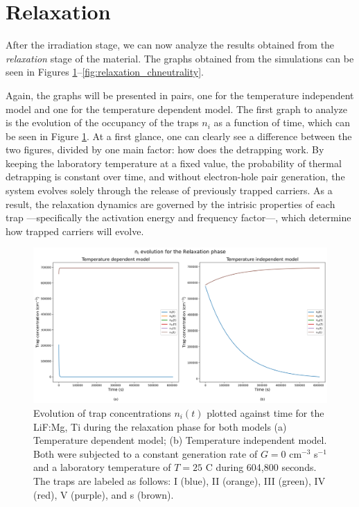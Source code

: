 \section{Relaxation}

After the irradiation stage, we can now analyze the results obtained from the \textit{relaxation} stage of the material. The graphs obtained from the simulations can be seen in Figures \ref{fig:relaxation_nievolution}--\ref{fig:relaxation_chneutrality}.

\vspace{10pt}

Again, the graphs will be presented in pairs, one for the temperature independent model and one for the temperature dependent model. The first graph to analyze is the evolution of the occupancy of the traps $n_i$ as a function of time, which can be seen in Figure \ref{fig:relaxation_nievolution}. At a first glance, one can clearly see a difference between the two figures, divided by one main factor: how does the detrapping work. By keeping the laboratory temperature at a fixed value, the probability of thermal detrapping is constant over time, and without electron-hole pair generation, the system evolves solely through the release of previously trapped carriers. %
As a result, the relaxation dynamics are governed by the intrisic properties of each trap ---specifically the activation energy and frequency factor---, which determine how trapped carriers will evolve. 

\vspace{10pt}

\begin{figure}
    \centering
    \includegraphics[width=\textwidth]{Images/Relaxation n_i evolution.png}
    \caption{Evolution of trap concentrations $n_i(t)$  plotted against time for the LiF:Mg, Ti during the relaxation phase for both models (a) Temperature dependent model; (b) Temperature independent model. Both were subjected to a constant generation rate of $G = 0$ cm$^{-3}$ s$^{-1}$ and a laboratory temperature of $T = 25$ \textdegree C during 604,800 seconds. The traps are labeled as follows: I (blue), II (orange), III (green), IV (red), V (purple), and s (brown).}
    \label{fig:relaxation_nievolution}
\end{figure}

